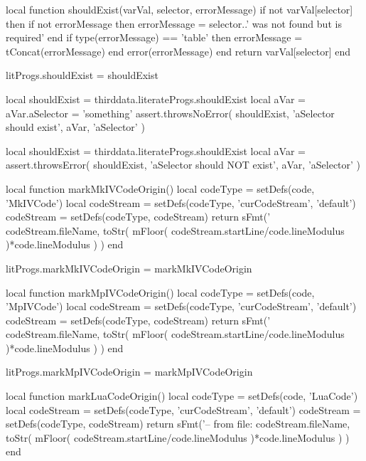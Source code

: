\startTestSuite[shouldExist]

\startLuaCode
local function shouldExist(varVal, selector, errorMessage)
  if not varVal[selector] then
    if not errorMessage then
      errorMessage = selector..' was not found but is required'
    end
    if type(errorMessage) == 'table' then
      errorMessage = tConcat(errorMessage)
    end
    error(errorMessage)
  end
  return varVal[selector]
end

litProgs.shouldExist = shouldExist

\stopLuaCode

\startLuaTest
  local shouldExist = thirddata.literateProgs.shouldExist
  local aVar = { }
  aVar.aSelector = 'something'
  assert.throwsNoError(
    shouldExist,
    'aSelector should exist',
    aVar,
    'aSelector'
  )
\stopLuaTest
\stopTestCase

\startLuaTest
  local shouldExist = thirddata.literateProgs.shouldExist
  local aVar = { }
  assert.throwsError(
    shouldExist,
    'aSelector should NOT exist',
    aVar,
    'aSelector'
  )
\stopLuaTest
\stopTestCase
\stopTestSuite

\startLuaCode
local function markMkIVCodeOrigin()
  local codeType       = setDefs(code, 'MkIVCode')
  local codeStream     = setDefs(codeType, 'curCodeStream', 'default')
  codeStream           = setDefs(codeType, codeStream)
  return sFmt('%
    codeStream.fileName,
    toStr(
      mFloor(
        codeStream.startLine/code.lineModulus
      )*code.lineModulus
    )
  )
end

litProgs.markMkIVCodeOrigin = markMkIVCodeOrigin

local function markMpIVCodeOrigin()
  local codeType       = setDefs(code, 'MpIVCode')
  local codeStream     = setDefs(codeType, 'curCodeStream', 'default')
  codeStream           = setDefs(codeType, codeStream)
  return sFmt('%
    codeStream.fileName,
    toStr(
      mFloor(
        codeStream.startLine/code.lineModulus
      )*code.lineModulus
    )
  )
end

litProgs.markMpIVCodeOrigin = markMpIVCodeOrigin

local function markLuaCodeOrigin()
  local codeType       = setDefs(code, 'LuaCode')
  local codeStream     = setDefs(codeType, 'curCodeStream', 'default')
  codeStream           = setDefs(codeType, codeStream)
  return sFmt('-- from file: %
    codeStream.fileName,
    toStr(
      mFloor(
        codeStream.startLine/code.lineModulus
      )*code.lineModulus
    )
  )
end

